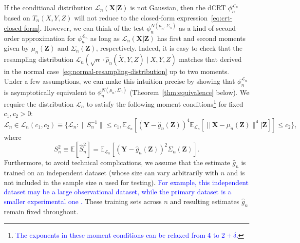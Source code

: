 \documentclass[ejs]{imsart}
\numberwithin{equation}{section}
\theoremstyle{plain}
\theoremstyle{definition}
\theoremstyle{remark}
\newcommand{\prx}{\bm X}
\newcommand{\srx}{X}
\newcommand{\prz}{\bm Z}
\newcommand{\srz}{Z}
\newcommand{\srxk}{\widetilde X}
\newcommand{\pry}{{\bm Y}}
\newcommand{\sry}{Y}
\begin{document}
If the conditional distribution $\mathcal L_n(\prx|\prz)$ is not Gaussian, then the dCRT $\phi_n^{\mathcal L_n}$ based on $T_n(\srx, \sry, \srz)$ will not reduce to the closed-form expression~\eqref{eq:crt-closed-form}. However, we can think of the test $\phi^{N(\mu_n, \Sigma_n)}_n$ as a kind of second-order approximation for $\phi_n^{\mathcal L_n}$ as long as $\mathcal L_n(\prx|\prz)$ has first and second moments given by $\mu_n(\prz)$ and $\Sigma_n(\prz)$, respectively. Indeed, it is easy to check that the resampling distribution $\mathcal L_n(\sqrt n \cdot \widehat \rho_n(\srxk, \sry, \srz) \mid \srx, \sry, \srz)$ matches that derived in the normal case~\eqref{eq:normal-resampling-distribution} up to two moments. Under a few assumptions, we can make this intuition precise by showing that $\phi_n^{\mathcal L_n}$ is asymptotically equivalent to $\phi^{N(\mu_n, \Sigma_n)}_n$ (Theorem~\ref{thm:equivalence} below). We require the distribution $\mathcal L_n$ to satisfy the following moment conditions\color{blue}\footnote{\textcolor{blue}{The exponents in these moment conditions can be relaxed from 4 to $2+\delta$.}} \color{black} for fixed $c_1, c_2 > 0$:
\small
\begin{equation}
\mathcal L_n \in \mathscr L_n(c_1, c_2) \equiv \{\mathcal L_n: \|S_{n}^{-1}\| \leq c_1, \mathbb E_{\mathcal L_n}\left[(\pry - \widehat g_n(\prz))^{4} \mathbb E_{\mathcal L_n}[\|\prx - \mu_n(\prz)\|^{4}|\prz]\right] \leq c_2 \},
\label{eq:moment-conditions}
\end{equation} 
\normalsize
where
\begin{equation}
S_n^2 \equiv \mathbb E[\widehat S_n^2] = \mathbb E_{\mathcal L_n}\left[(\pry - \widehat g_n(\prz))^2 \Sigma_n(\prz)\right].
\end{equation}
Furthermore, to avoid technical complications, we assume that the estimate $\widehat g_n$ is trained on an independent dataset (whose size can vary arbitrarily with $n$ and is not included in the sample size $n$ used for testing). \textcolor{blue}{For example, this independent dataset may be a large observational dataset, while the primary dataset is a smaller experimental one \cite{Bates2020}.} These training sets across $n$ and resulting estimates $\widehat g_n$ remain fixed throughout.
\end{document}
